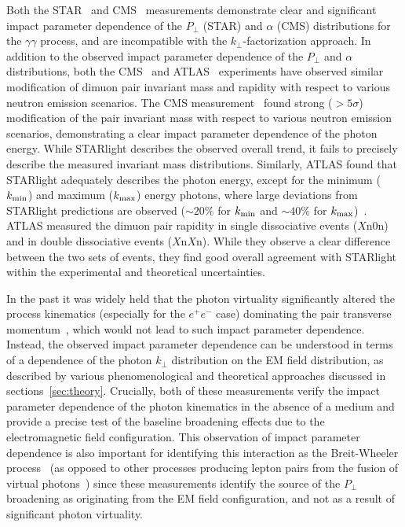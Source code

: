 \documentclass[twocolumn,epjc3]{svjour3}\sloppy
\begin{document}
Both the STAR~\cite{starcollaborationMeasurementMomentumAngular2021} and CMS~\cite{cmscollaborationObservationForwardNeutron2020a} measurements demonstrate clear and significant impact parameter dependence of the $P_\perp$ (STAR) and $\alpha$ (CMS) distributions for the $\gamma\gamma$ process, and are incompatible with the $k_\perp$-factorization approach.
In addition to the observed impact parameter dependence of the $P_\perp$ and $\alpha$ distributions, both the CMS~\cite{cmscollaborationObservationForwardNeutron2020a} and ATLAS~\cite{atlascollaborationExclusiveDimuonProduction2020} experiments have observed similar modification of dimuon pair invariant mass and rapidity with respect to various neutron emission scenarios. The CMS measurement~\cite{cmscollaborationObservationForwardNeutron2020a} found strong ($>5\sigma$) modification of the pair invariant mass with respect to various neutron emission scenarios, demonstrating a clear impact parameter dependence of the photon energy. While STARlight describes the observed overall trend, it fails to precisely describe the measured invariant mass distributions. Similarly, ATLAS found that STARlight adequately describes the photon energy, except for the minimum ($k_{\rm min}$) and maximum ($k_{\rm max}$) energy photons, where large deviations from STARlight predictions are observed ($\sim20\%$ for $k_{\rm min}$ and $\sim40\%$ for $k_{\rm max}$)~\cite{atlascollaborationExclusiveDimuonProduction2020}. ATLAS measured the dimuon pair rapidity in single dissociative events ($X$n$0$n) and in double dissociative events ($X$n$X$n). While they observe a clear difference between the two sets of events, they find good overall agreement with STARlight within the experimental and theoretical uncertainties. 

In the past it was widely held that the photon virtuality significantly altered the process kinematics (especially for the $e^+e^-$ case) dominating the pair transverse momentum~\cite{baltzPhysicsUltraperipheralCollisions2008}, which would not lead to such impact parameter dependence.
Instead, the observed impact parameter dependence can be understood in terms of a dependence of the photon $k_\perp$ distribution on the EM field distribution, as described by various phenomenological and theoretical approaches discussed in sections~\ref{sec:theory}. 
Crucially, both of these measurements verify the impact parameter dependence of the photon kinematics in the absence of a medium and provide a precise test of the baseline broadening effects due to the electromagnetic field configuration. 
This observation of impact parameter dependence is also important for identifying this interaction as the Breit-Wheeler process~\cite{starcollaborationMeasurementMomentumAngular2021} (as opposed to other processes producing lepton pairs from the fusion of virtual photons~\cite{Landau1934,bethe_h_stopping_1934}) since these measurements identify the source of the $P_\perp$ broadening as originating from the EM field configuration, and not as a result of significant photon virtuality.
\end{document}
